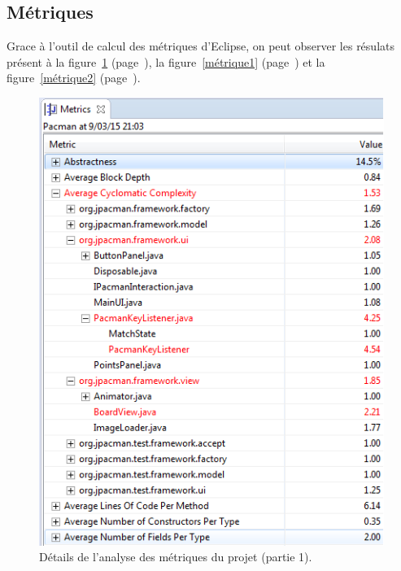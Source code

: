 \documentclass[12pt,a4paper,final]{article}
\newcommand{\labelfigure}[1]{figure~\ref{#1} (page~\pageref{#1})}
\begin{document}
\subsection{Métriques}
Grace à l'outil de calcul des métriques d'Eclipse, on peut observer les résulats présent à la \labelfigure{métrique0}, la \labelfigure{métrique1} et la \labelfigure{métrique2}.\\
\begin{figure}[!h]
	\centering
	\includegraphics[height=\textheight]{Metrique0.png}
	\caption{\label{métrique0}Détails de l'analyse des métriques du projet (partie 1).}
\end{figure}
\end{document}
